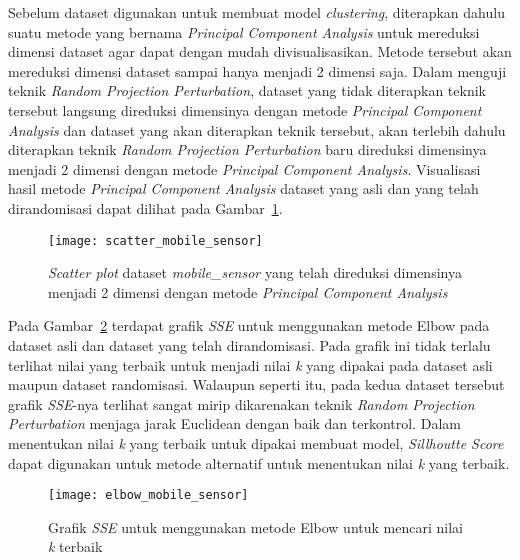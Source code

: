 Sebelum dataset digunakan untuk membuat model \textit{clustering}, diterapkan dahulu suatu metode yang bernama \textit{Principal Component Analysis} untuk mereduksi dimensi dataset agar dapat dengan mudah divisualisasikan. Metode tersebut akan mereduksi dimensi dataset sampai hanya menjadi 2 dimensi saja. Dalam menguji teknik \textit{Random Projection Perturbation}, dataset yang tidak diterapkan teknik tersebut langsung direduksi dimensinya dengan metode \textit{Principal Component Analysis} dan dataset yang akan diterapkan teknik tersebut, akan terlebih dahulu diterapkan teknik \textit{Random Projection Perturbation} baru direduksi dimensinya menjadi 2 dimensi dengan metode \textit{Principal Component Analysis}. Visualisasi hasil metode \textit{Principal Component Analysis} dataset yang asli dan yang telah dirandomisasi dapat dilihat pada Gambar~\ref{fig:scatter_mobile_sensor}.

\begin{figure}
	\centering
	\texttt{[image: scatter\_mobile\_sensor]}
	\caption{\textit{Scatter plot} dataset \textit{mobile\_sensor} yang telah direduksi dimensinya menjadi 2 dimensi dengan metode \textit{Principal Component Analysis}}
	\label{fig:scatter_mobile_sensor}
\end{figure}

Pada Gambar~\ref{fig:elbow_mobile_sensor} terdapat grafik \textit{SSE} untuk menggunakan metode Elbow pada dataset asli dan dataset yang telah dirandomisasi. Pada grafik ini tidak terlalu terlihat nilai yang terbaik untuk menjadi nilai \textit{k} yang dipakai pada dataset asli maupun dataset randomisasi. Walaupun seperti itu, pada kedua dataset tersebut grafik \textit{SSE}-nya terlihat sangat mirip dikarenakan teknik \textit{Random Projection Perturbation} menjaga jarak Euclidean dengan baik dan terkontrol. Dalam menentukan nilai \textit{k} yang terbaik untuk dipakai membuat model, \textit{Sillhoutte Score} dapat digunakan untuk metode alternatif untuk menentukan nilai \textit{k} yang terbaik.

\begin{figure}
	\centering
	\texttt{[image: elbow\_mobile\_sensor]}
	\caption{Grafik \textit{SSE} untuk menggunakan metode Elbow untuk mencari nilai \textit{k} terbaik}
	\label{fig:elbow_mobile_sensor}
\end{figure}

